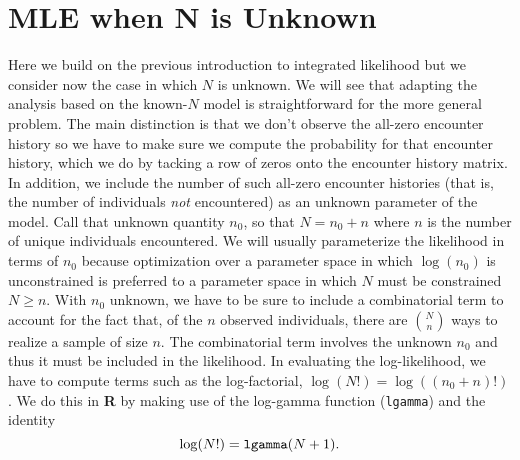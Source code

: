 

\section{MLE when N is Unknown} 
\label{mle.sec.Nunknown}

Here we build on the previous introduction to integrated likelihood
but we consider now the case in which $N$ is unknown. We will see that
adapting the analysis based on the known-$N$ model is 
straightforward for the more general problem. The main distinction is
that we don't observe the all-zero encounter history so we have to
make sure we compute the probability for that encounter history,  which
we do by tacking a row of zeros onto the encounter history matrix. In
addition, we include the number of such all-zero encounter histories
(that is, the number of individuals {\it not} encountered)
as an unknown parameter of the model. Call that unknown quantity
$n_{0}$, so that $N=n_{0}+n$ where $n$ is the number of unique
individuals encountered. We will usually parameterize the
likelihood in terms of $n_{0}$ because optimization over a parameter
space in which $\log(n_{0})$ is unconstrained is preferred to a
parameter space in which $N$ must be constrained $N\ge n$.
With $n_{0}$ unknown, we have to be sure to include a combinatorial term to
account for the fact that, of the $n$ observed individuals, there are
${N \choose n}$ 
ways to realize a sample of size $n$. The
combinatorial term involves the unknown $n_{0}$ and thus it must be
included in the likelihood. In evaluating the  log-likelihood, we
have to compute terms such as the log-factorial, $\log(N!) = \log((n_{0}+n)!)$. 
We do this in {\bf R} by making use of the log-gamma function
(\mbox{\tt lgamma}) and the identity
\[
 \log(N!) = \mbox{\tt lgamma}(N+1).
\]

